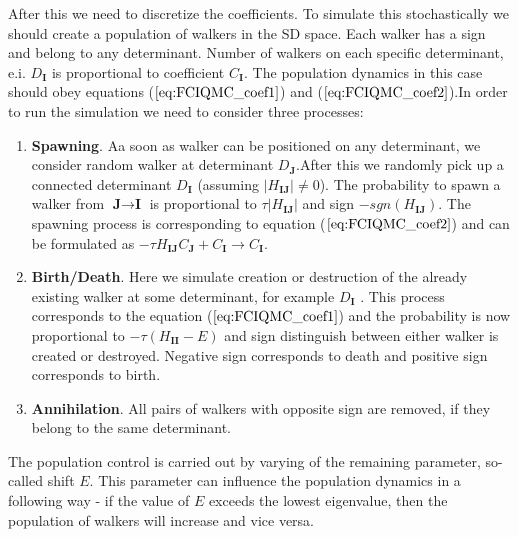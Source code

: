 \documentclass[twoside,english]{uiofysmaster}
\theoremstyle{definition}
\begin{document}
After this we need to discretize the coefficients. To simulate this stochastically we should create a population of walkers in the SD space. Each walker has a sign and belong to any determinant. Number of walkers on each specific determinant, e.i. $D_{\textbf{I}}$ is proportional to coefficient $C_{\textbf{I}}$. The population dynamics in this case should obey equations ($\ref{eq:FCIQMC_coef1}$) and ($\ref{eq:FCIQMC_coef2}$).In order to run the simulation we need to consider three processes:\\
\begin{enumerate}
	\item \textbf{Spawning}. Aa soon as walker can be positioned on any determinant, we consider random walker at determinant $D_{\textbf{J}}$.After this we randomly pick up a connected determinant  $D_{\textbf{I}}$ (assuming $|H_{\textbf{IJ}}|\neq 0$). The probability to spawn a walker from $\textbf{J} \rightarrow \textbf{I} $ is proportional to $\tau |H_{\textbf{IJ}}| $ and sign $- sgn(H_{\textbf{IJ}})$. The spawning process is corresponding to equation ($\ref{eq:FCIQMC_coef2}$) and can be formulated as $ - \tau H_{\textbf{IJ}} C_{\textbf{J}} + C_{\textbf{I}} \rightarrow  C_{\textbf{I}} $.
	\item \textbf{Birth/Death}. Here we simulate creation or destruction of the already existing walker at some determinant, for example $D_{\textbf{I}}$ . This process corresponds to the  equation ($\ref{eq:FCIQMC_coef1}$) and the probability is now proportional to $- \tau (H_{\textbf{II}} - E) $ and sign distinguish between either walker is created or destroyed. Negative sign corresponds to death and positive sign corresponds to birth.
	\item \textbf{Annihilation}. All pairs of walkers with opposite sign are removed, if they belong to the same determinant.
\end{enumerate}
The population control is carried out by varying of the remaining parameter, so-called shift $E$. This parameter can influence the population dynamics in a following way - if the value of $E$ exceeds the lowest eigenvalue, then the population of walkers will increase and vice versa. 
\end{document}
